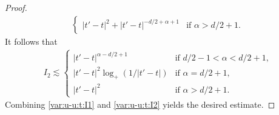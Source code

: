\documentclass[reqno]{amsart}
\DeclareMathOperator{\Var}{Var}
\newcommand{\E}{\mathbb E}
\renewcommand{\d}{\mathrm d}
\newcommand{\1}{\mathbf 1}
\numberwithin{equation}{section}
\newtheorem{lemma}[theorem]{Lemma}
\theoremstyle{definition}
\begin{document}
\begin{proof}
\begin{align*}
\begin{cases}
	|t'-t|^2  + |t'-t|^{-d/2+\alpha+1} & \text{if $\alpha>d/2+1$.}
	\end{cases}
\end{align*}
It follows that
\begin{align}\label{var:u-u:t:I2}
	I_2 \lesssim 
	\begin{cases}
	|t'-t|^{\alpha-d/2+1} & \text{if $d/2-1<\alpha<d/2+1$,}\\
	|t'-t|^2 \log_+(1/|t'-t|) & \text{if $\alpha=d/2+1$,}\\
	|t'-t|^2 & \text{if $\alpha>d/2+1$.}
	\end{cases}
\end{align}
Combining \eqref{var:u-u:t:I1} and \eqref{var:u-u:t:I2} yields the desired estimate.
\end{proof}
%
%
\end{document}
